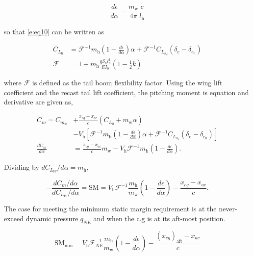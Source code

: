 \documentclass[]{aiaa-tc}%
\begin{document}
\begin{equation}
    \frac{d\epsilon}{d\alpha} = \frac{m_{\text{w}}}{4\pi} \frac{c}{l_{\text{h}}}
\end{equation}

so that \eqref{e:eq10} can be written as

\begin{align}
    C_{L_{\text{h}}} &= \mathcal{F}^{-1} m_{\text{h}} \left( 1 - \frac{d\epsilon}{d\alpha}\right) \alpha + \mathcal{F}^{-1} C_{L_{h_{\delta}}}(\delta_e - \delta_{e_0}) \\
    \mathcal{F} &= 1 + m_{\text{h}} \frac{qS_{\text{h}}l_{\text{h}}^2}{EI_0}(1-\frac{1}{2}k) 
\end{align}

where $\mathcal{F}$ is defined as the tail boom flexibility factor. 
Using the wing lift coefficient and the recast tail lift coefficient, the pitching moment is equation and derivative are given as,

\begin{align}
    C_m = C_{m_{\text{w}}} &+ \frac{x_{cg} - x_{ac}}{c} (C_{L_0} + m_{\text{w}} \alpha) \nonumber\\ 
    &- V_{\text{h}} \left[ \mathcal{F}^{-1} m_{\text{h}} \left( 1 - \frac{d\epsilon}{d\alpha}\right) \alpha + \mathcal{F}^{-1} C_{L_{h_{\delta}}}(\delta_e - \delta_{e_0})\right] \\
    \frac{dC_m}{d\alpha} & = \frac{x_{cg} - x_{ac}}{c} m_{\text{w}}  - V_{\text{h}} \mathcal{F}^{-1} m_{\text{h}} \left( 1 - \frac{d\epsilon}{d\alpha}\right).
\end{align}

Dividing by $dC_{L_W}/d\alpha = m_{\text{h}}$, 

\begin{equation}
    -\frac{dC_m/d\alpha}{dC_{L_W}/d\alpha} = \text{SM} = V_{\text{h}} \mathcal{F}^{-1} \frac{m_{\text{h}}}{m_{\text{w}}} \left( 1 - \frac{d\epsilon}{d\alpha}\right) - \frac{x_{cg} - x_{ac}}{c}.
\end{equation}

The case for meeting the minimum static margin requirement is at the never-exceed dynamic pressure $q_{NE}$ and when the c.g is at its aft-most position.

\begin{equation}
    \text{SM}_{\text{min}} = V_{\text{h}} \mathcal{F}_{NE}^{-1} \frac{m_{\text{h}}}{m_{\text{w}}} \left( 1 - \frac{d\epsilon}{d\alpha}\right) - \frac{(x_{cg})_{\text{aft}} - x_{ac}}{c} 
\end{equation}
\end{document}
